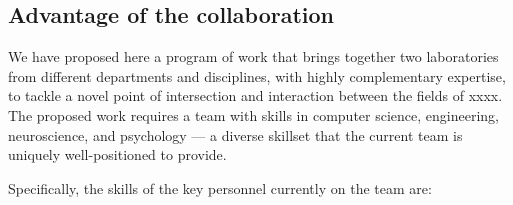\subsection{Advantage of the collaboration}



We have proposed here a program of work that brings together two laboratories from different departments and disciplines, with highly complementary expertise, to tackle a novel point of intersection and interaction between the fields of xxxx.
The proposed work requires a team with skills in computer science, engineering, neuroscience, and psychology --- a diverse skillset that the current team is uniquely well-positioned to provide.

Specifically, the skills of the key personnel currently on the team are:


